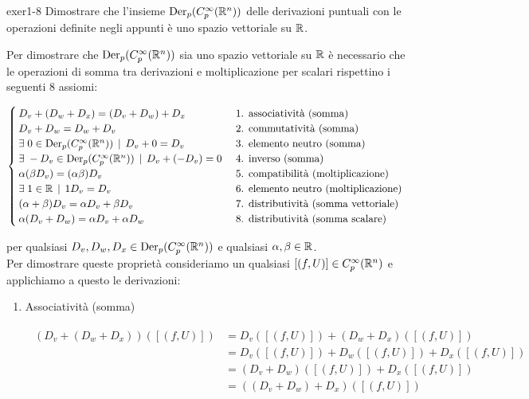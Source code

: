 {exer1-8}
{
Dimostrare che l'insieme $ \operatorname{Der}_{p}(C_{p}^{\infty}(\mathbb{R}^{n})) $ delle derivazioni puntuali con le operazioni definite negli appunti è uno spazio vettoriale su $ \mathbb{R} $.
}
{
Per dimostrare che $ \operatorname{Der}_{p}(C_{p}^{\infty}(\mathbb{R}^{n})) $ sia uno spazio vettoriale su $ \mathbb{R} $ è necessario che le operazioni di somma tra derivazioni e moltiplicazione per scalari rispettino i seguenti 8 assiomi:

\begin{equation}
	\begin{cases}
		D_{v} + (D_{w} + D_{x}) = (D_{v} + D_{w}) + D_{x} & \text{ 1. associatività (somma) } \\
		D_{v} + D_{w} = D_{w} + D_{v} & \text{ 2. commutatività (somma) } \\
		\exists \; 0 \in \operatorname{Der}_{p}(C_{p}^{\infty}(\mathbb{R}^{n})) \, \mid \, D_{v} + 0 = D_{v} & \text{ 3. elemento neutro (somma) } \\
		\exists \; - D_{v} \in \operatorname{Der}_{p}(C_{p}^{\infty}(\mathbb{R}^{n})) \, \mid \, D_{v} + (- D_{v}) = 0 & \text{ 4. inverso (somma) } \\
		\alpha (\beta D_{v}) = (\alpha \beta) D_{v} & \text{ 5. compatibilità (moltiplicazione) } \\
		\exists \; 1 \in \mathbb{R} \, \mid \, 1 D_{v} = D_{v} & \text{ 6. elemento neutro (moltiplicazione) } \\
		(\alpha + \beta) D_{v} = \alpha D_{v} + \beta D_{v} & \text{ 7. distributività (somma vettoriale) } \\
		\alpha (D_{v} + D_{w}) = \alpha D_{v} + \alpha D_{w} & \text{ 8. distributività (somma scalare) }
	\end{cases}
\end{equation}

per qualsiasi $ D_{v}, D_{w}, D_{x} \in \operatorname{Der}_{p}(C_{p}^{\infty}(\mathbb{R}^{n})) $ e qualsiasi $ \alpha, \beta \in \mathbb{R} $. \\
Per dimostrare queste proprietà consideriamo un qualsiasi $ [(f,U)] \in C_{p}^{\infty}(\mathbb{R}^{n}) $ e applichiamo a questo le derivazioni:

\begin{enumerate}
	\item Associatività (somma)
	
	\begin{align}
		\begin{split}
			( D_{v} + (D_{w} + D_{x}) ) ([(f,U)]) &= D_{v} ([(f,U)]) + (D_{w} + D_{x}) ([(f,U)]) \\
			&= D_{v} ([(f,U)]) + D_{w} ([(f,U)]) + D_{x} ([(f,U)]) \\
			&= (D_{v} + D_{w}) ([(f,U)]) + D_{x} ([(f,U)]) \\
			&= ( (D_{v} + D_{w}) + D_{x} ) ([(f,U)])
		\end{split}
	\end{align}
	

\end{enumerate}}
